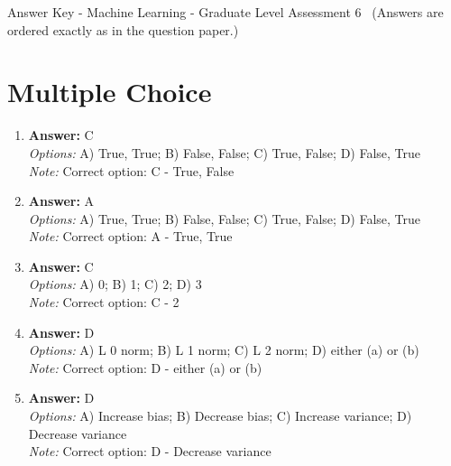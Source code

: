 \documentclass[12pt]{article}
\begin{document}
\begin{center}
Answer Key - Machine Learning - Graduate Level Assessment 6 \
\small (Answers are ordered exactly as in the question paper.)
\end{center}

\section*{Multiple Choice}
\begin{enumerate}[label=\arabic*.]
\item \textbf{Answer:} C
\\ \textit{Options:} A) True, True; B) False, False; C) True, False; D) False, True
\\ \textit{Note:} Correct option: C - True, False
\item \textbf{Answer:} A
\\ \textit{Options:} A) True, True; B) False, False; C) True, False; D) False, True
\\ \textit{Note:} Correct option: A - True, True
\item \textbf{Answer:} C
\\ \textit{Options:} A) 0; B) 1; C) 2; D) 3
\\ \textit{Note:} Correct option: C - 2
\item \textbf{Answer:} D
\\ \textit{Options:} A) L 0 norm; B) L 1 norm; C) L 2 norm; D) either (a) or (b)
\\ \textit{Note:} Correct option: D - either (a) or (b)
\item \textbf{Answer:} D
\\ \textit{Options:} A) Increase bias; B) Decrease bias; C) Increase variance; D) Decrease variance
\\ \textit{Note:} Correct option: D - Decrease variance
\end{enumerate}
\end{document}
